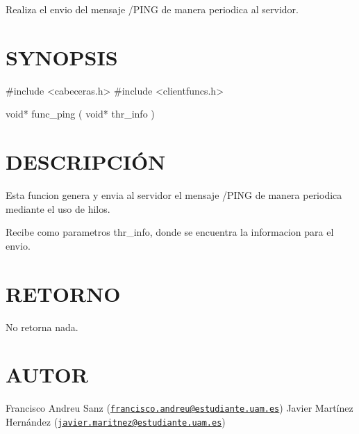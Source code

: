 Realiza el envio del mensaje /\-P\-I\-N\-G de manera periodica al servidor.\hypertarget{ServerReply_SYNOPSIS}{}\section{S\-Y\-N\-O\-P\-S\-I\-S}\label{ServerReply_SYNOPSIS}
\begin{DoxyVerb} #include  <cabeceras.h>
   #include  <clientfuncs.h>

 void* func_ping ( void* thr_info )
\end{DoxyVerb}
\hypertarget{ServerReply_descripcion}{}\section{D\-E\-S\-C\-R\-I\-P\-C\-IÓ\-N}\label{ServerReply_descripcion}
Esta funcion genera y envia al servidor el mensaje /\-P\-I\-N\-G de manera periodica mediante el uso de hilos.

Recibe como parametros thr\-\_\-info, donde se encuentra la informacion para el envio.\hypertarget{ServerReply_retorno}{}\section{R\-E\-T\-O\-R\-N\-O}\label{ServerReply_retorno}
No retorna nada.\hypertarget{ServerReply_authors}{}\section{A\-U\-T\-O\-R}\label{ServerReply_authors}
Francisco Andreu Sanz (\href{mailto:francisco.andreu@estudiante.uam.es}{\tt francisco.\-andreu@estudiante.\-uam.\-es}) Javier Martínez Hernández (\href{mailto:javier.maritnez@estudiante.uam.es}{\tt javier.\-maritnez@estudiante.\-uam.\-es}) 

 